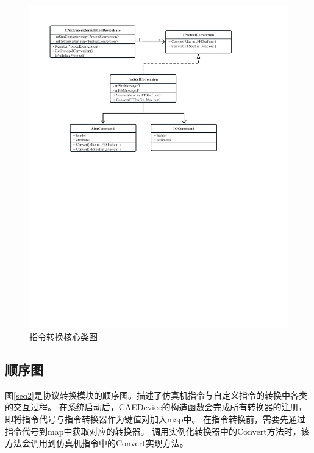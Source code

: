 \begin{figure}[h!]
    \begin{center}
        \includegraphics[width=\textwidth]{pictures/classdiagram2.pdf}
        \caption{指令转换核心类图}
        \label{module22}
    \end{center}
\end{figure}
\subsection{顺序图}
图\ref{seq2}是协议转换模块的顺序图。描述了仿真机指令与自定义指令的转换中各类的交互过程。
在系统启动后，CAEDevice的构造函数会完成所有转换器的注册，即将指令代号与指令转换器作为键值对加入map中。
在指令转换前，需要先通过指令代号到map中获取对应的转换器。
调用实例化转换器中的Convert方法时，该方法会调用到仿真机指令中的Convert实现方法。

